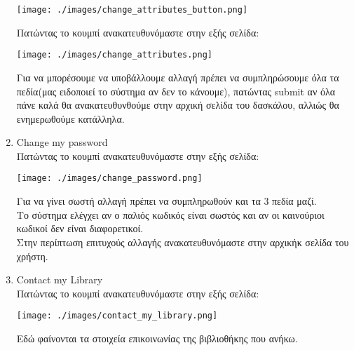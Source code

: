 \documentclass[14pt]{report}
\begin{document}
\begin{enumerate}[label=(\arabic*)]
 		\vspace{\baselineskip}
 		
 		\texttt{[image: ./images/change\_attributes\_button.png]}
 		
 		\vspace{\baselineskip}
 		
 		\newpage
 		Πατώντας το κουμπί ανακατευθυνόμαστε στην εξής σελίδα: \\
 		
 		\vspace{\baselineskip}
 		
 		\texttt{[image: ./images/change\_attributes.png]}
 		
 		\vspace{\baselineskip}
 		
 		Για να μπορέσουμε να υποβάλλουμε αλλαγή πρέπει να συμπληρώσουμε όλα τα πεδία(μας ειδοποιεί το σύστημα αν δεν το κάνουμε), πατώντας submit αν όλα πάνε καλά θα ανακατευθυνθούμε στην αρχική σελίδα του δασκάλου, αλλιώς θα ενημερωθούμε κατάλληλα. \\
 		
 		\newpage
 		\hypertarget{s-change-password}{}
 		\item Change my password \\
 		Πατώντας το κουμπί ανακατευθυνόμαστε στην εξής σελίδα: \\
 		
 		\vspace{\baselineskip}
 		
 		\texttt{[image: ./images/change\_password.png]}
 		
 		\vspace{\baselineskip}
 		
 		Για να γίνει σωστή αλλαγή πρέπει να συμπληρωθούν και τα 3 πεδία μαζί. \\
 		Το σύστημα ελέγχει αν ο παλιός κωδικός είναι σωστός και αν οι καινούριοι κωδικοί δεν είναι διαφορετικοί. \\
 		Στην περίπτωση επιτυχούς αλλαγής ανακατευθυνόμαστε στην αρχικήκ σελίδα του χρήστη. 
 		
 		\newpage
 		\hypertarget{s-contact-library}{}
 		\item Contact my Library \\
 		Πατώντας το κουμπί ανακατευθυνόμαστε στην εξής σελίδα: \\
 		
 		\vspace{\baselineskip}
 		
 		\texttt{[image: ./images/contact\_my\_library.png]}
 		
 		\vspace{\baselineskip}
 		
 		Εδώ φαίνονται τα στοιχεία επικοινωνίας της βιβλιοθήκης που ανήκω. \\
	\end{enumerate}
	
\end{document}
